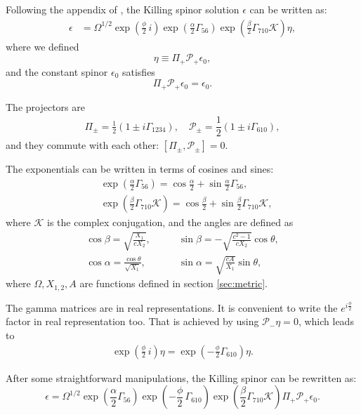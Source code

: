 
Following the appendix of \cite{Chen-Lin:2015xlh}, the Killing spinor solution $\epsilon$ can be written as:
\begin{align}
\epsilon &= \Omega^{1/2} \exp{\left(\frac{\phi}{2}\, i \right)} \exp{\left(\frac{\alpha}{2}\Gamma_{56} \right)} \exp{\left(\frac{\beta}{2}\Gamma_{7 10} \mathcal{K} \right)} \eta,
\end{align}
where we defined
\begin{equation}
\eta \equiv \Pi_{+} \mathcal{P}_+ \epsilon_0,
\end{equation}
and the constant spinor $\epsilon_0$ satisfies
\begin{equation}
 \Pi_+ \mathcal{P}_+ \epsilon_0 = \epsilon_0.
\end{equation}

The projectors are
\begin{align}\label{eq:projectors}
\Pi_\pm = 
\frac{1}{2}\left(1 \pm i\Gamma_{1234}\right), 
\quad
\mathcal{P}_{\pm} =
\dfrac{1}{2} \left(1\pm i\Gamma_{6 10}\right),
\end{align}
and they commute with each other: $[\Pi_\pm, \mathcal{P}_{\pm}]=0$. 


The exponentials can be written in terms of cosines and sines:
\begin{align}
&\exp{\left(\frac{\alpha}{2}\Gamma_{56} \right)} = \cos\frac{\alpha}{2} + \sin\frac{\alpha}{2}\Gamma_{5 6},\\
&\exp{\left(\frac{\beta}{2}\Gamma_{7 10} \mathcal{K} \right)} = \cos\frac{\beta}{2} + \sin\frac{\beta}{2}\Gamma_{7 10}\mathcal{K},
\end{align}
where $\mathcal{K}$ is the complex conjugation, and the angles are defined as
\begin{align}
\cos\beta = \sqrt{\frac{X_1}{c X_2}}, \quad 
&\quad
\sin\beta = -\sqrt{\frac{c^2 - 1}{c X_2}}\cos\theta,\\
%
\cos\alpha = \frac{\cos\theta}{\sqrt{X_1}}, 
&\quad
\sin\alpha = \sqrt{\frac{c A}{X_1}}\sin\theta,
\end{align}
where $\Omega, X_{1,2}, A$ are functions defined in section \ref{sec:metric}.


The gamma matrices are in real representations. It is convenient to write the $e^{i \frac{\phi}{2}}$ factor in real representation too. 
That is achieved by using $\mathcal{P}_- \eta = 0 $, which leads to
\begin{align}
 \exp{\left(\frac{\phi}{2}\, i \right)} \eta 
    = \exp{\left(-\frac{\phi}{2}\Gamma_{6 10} \right)} \eta. 
\end{align}

After some straightforward manipulations, the Killing spinor can be rewritten as:
\begin{equation}\label{eq:KillingSpinor}
\epsilon =  \Omega^{1/2} \exp{\left(\frac{\alpha}{2}\Gamma_{56} \right)} \exp{\left(-\frac{\phi}{2}\, \Gamma_{6 10} \right)} \exp{\left(\frac{\beta}{2}\Gamma_{7 10} \mathcal{K} \right)} \Pi_{+} \mathcal{P}_+ \epsilon_0.
\end{equation}

